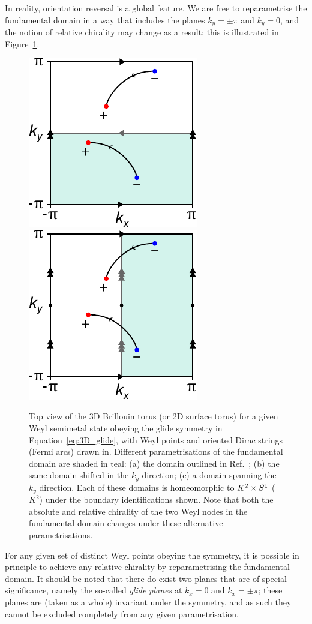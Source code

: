 In reality, orientation reversal is a global feature. We are free to reparametrise the fundamental domain in a way that includes the planes $k_y=\pm\pi$ and $k_y=0$, and the notion of relative chirality may change as a result; this is illustrated in Figure~\ref{fig:BZ_param}.
\begin{figure}[htb!]
	\centering
	 {\includegraphics[width=.3\textwidth]{Images/BZ_basic}}
	\hfil
	\hfil
	 {\includegraphics[width=.3\textwidth]{Images/BZ_right}}
	\caption{Top view of the 3D Brillouin torus (or 2D surface torus) for a given Weyl semimetal state obeying the glide symmetry in Equation~\eqref{eq:3D_glide}, with Weyl points and oriented Dirac strings (Fermi arcs) drawn in. Different parametrisations of the fundamental domain are shaded in teal: (a) the domain outlined in Ref.~\cite{Fonseca-Vaidya_nonorientable}; (b) the same domain shifted in the $k_y$ direction; (c) a domain spanning the $k_y$ direction. Each of these domains is homeomorphic to $K^2\times S^1$ ($K^2$) under the boundary identifications shown. Note that both the absolute and relative chirality of the two Weyl nodes in the fundamental domain changes under these alternative parametrisations.}
	\label{fig:BZ_param}
\end{figure}
For any given set of distinct Weyl points obeying the symmetry, it is possible in principle to achieve any relative chirality by reparametrising the fundamental domain. It should be noted that there do exist two planes that are of special significance, namely the so-called \emph{glide planes} at $k_x = 0$ and $k_x = \pm\pi$; these planes are (taken as a whole) invariant under the symmetry, and as such they cannot be excluded completely from any given parametrisation.

